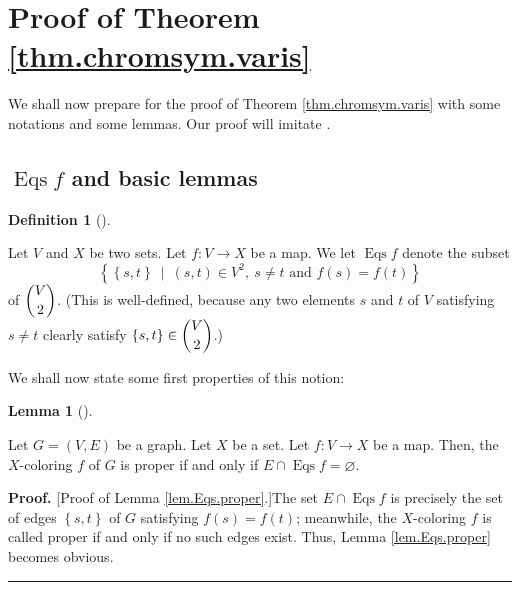 \documentclass[numbers=enddot,12pt,final,onecolumn,notitlepage]{scrartcl}%
\theoremstyle{definition}
\newtheorem{lem}[theo]{Lemma}
\newenvironment{lemma}[1][]
{\begin{lem}[#1]\begin{leftbar}}
{\end{leftbar}\end{lem}}
\newtheorem{defi}[theo]{Definition}
\newenvironment{definition}[1][]
{\begin{defi}[#1]\begin{leftbar}}
{\end{leftbar}\end{defi}}
\newenvironment{proof}[1][Proof]{\noindent\textbf{#1.} }{\ \rule{0.5em}{0.5em}}
\newenvironment{vershort}{}{}
\begin{document}
\section{Proof of Theorem \ref{thm.chromsym.varis}}

We shall now prepare for the proof of Theorem \ref{thm.chromsym.varis} with
some notations and some lemmas. Our proof will imitate \cite[proof of
Whitney's theorem]{BlaSag86}.

\subsection{$\operatorname*{Eqs}f$ and basic lemmas}

\begin{definition}
\label{def.Eqs}Let $V$ and $X$ be two sets. Let $f:V\rightarrow X$ be a map.
We let $\operatorname*{Eqs}f$ denote the subset%
\[
\left\{  \left\{  s,t\right\}  \ \mid\ \left(  s,t\right)  \in V^{2},\ s\neq
t\text{ and }f\left(  s\right)  =f\left(  t\right)  \right\}
\]
of $\dbinom{V}{2}$. (This is well-defined, because any two elements $s$ and
$t$ of $V$ satisfying $s\neq t$ clearly satisfy $\left\{  s,t\right\}
\in\dbinom{V}{2}$.)
\end{definition}

We shall now state some first properties of this notion:

\begin{lemma}
\label{lem.Eqs.proper}Let $G=\left(  V,E\right)  $ be a graph. Let $X$ be a
set. Let $f:V\rightarrow X$ be a map. Then, the $X$-coloring $f$ of $G$ is
proper if and only if $E\cap\operatorname*{Eqs}f=\varnothing$.
\end{lemma}

\begin{vershort}
\begin{proof}
[Proof of Lemma \ref{lem.Eqs.proper}.]The set $E\cap\operatorname*{Eqs}f$ is
precisely the set of edges $\left\{  s,t\right\}  $ of $G$ satisfying
$f\left(  s\right)  =f\left(  t\right)  $; meanwhile, the $X$-coloring $f$ is
called proper if and only if no such edges exist. Thus, Lemma
\ref{lem.Eqs.proper} becomes obvious.
\end{proof}
\end{vershort}
\end{document}
